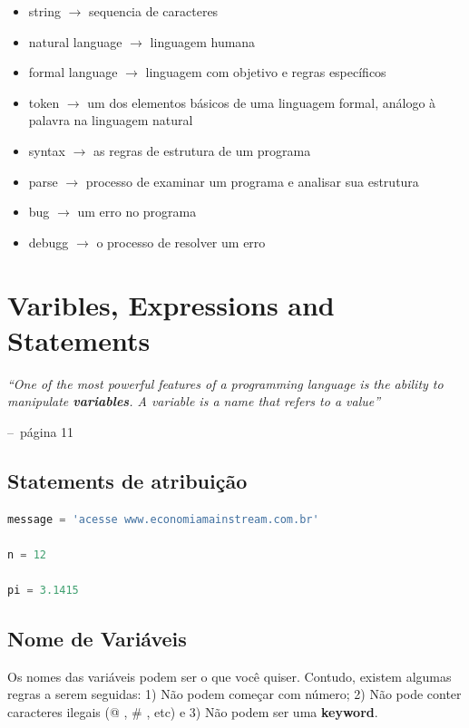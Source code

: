 \documentclass[a4paper,11pt]{book}
\makeatletter
\newenvironment{chapquote}[2][2em]
  {\setlength{\@tempdima}{#1}%
   \def\chapquote@author{#2}%
   \parshape 1 \@tempdima \dimexpr\textwidth-2\@tempdima\relax%
   \itshape}
  {\par\normalfont\hfill--\ \chapquote@author\hspace*{\@tempdima}\par\bigskip}
\makeatother
\begin{document}
\begin{itemize}
	\item string $\rightarrow$ sequencia de caracteres
	\item natural language $\rightarrow$ linguagem humana
	\item formal language $\rightarrow$ linguagem com objetivo e regras específicos
	\item token $\rightarrow$ um dos elementos básicos de uma linguagem formal, análogo à palavra na linguagem natural
	\item syntax $\rightarrow$ as regras de estrutura de um programa
	\item parse $\rightarrow$ processo de examinar um programa e analisar sua estrutura
	\item bug $\rightarrow$ um erro no programa
	\item debugg $\rightarrow$ o processo de resolver um erro
\end{itemize}

\chapter{Varibles, Expressions and Statements}

\begin{chapquote}{página 11}
	``One of the most powerful features of a programming language is the ability to manipulate \textbf{variables}. A variable is a name that refers to a value''
\end{chapquote}

\section{Statements de atribuição}
\begin{lstlisting}[language=Python, caption=Atribuições para diferentes classes]
message = 'acesse www.economiamainstream.com.br'

n = 12

pi = 3.1415
\end{lstlisting}

\section{Nome de Variáveis}
Os nomes das variáveis podem ser o que você quiser. Contudo, existem algumas regras a serem seguidas: 1) Não podem começar com número; 2) Não pode conter caracteres ilegais (@ , \# ,  etc) e 3) Não podem ser uma \textbf{keyword}.
\end{document}
